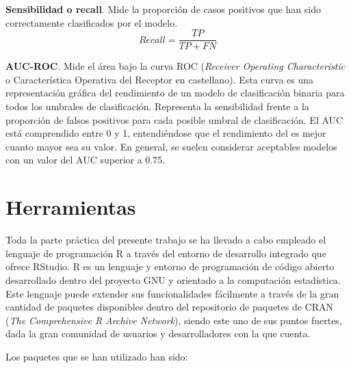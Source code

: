 \documentclass[12pt,a4paper,]{book}
\numberwithin{dummy}{section}
\theoremstyle{ocrenumbox}
\theoremstyle{blacknumex}
\theoremstyle{blacknumbox}
\theoremstyle{ocrenum}
\theoremstyle{ocrenum}
\begin{document}
\textbf{Sensibilidad o recall}. Mide la proporción de casos positivos
que han sido correctamente clasificados por el modelo.
\[ Recall = \frac{TP}{TP + FN}\]

\textbf{AUC-ROC}. Mide el área bajo la curva ROC (\emph{Receiver
Operating Characteristic} o Característica Operativa del Receptor en
castellano). Esta curva es una representación gráfica del rendimiento de
un modelo de clasificación binaria para todos los umbrales de
clasificación. Representa la sensibilidad frente a la proporción de
falsos positivos para cada posible umbral de clasificación. El AUC está
comprendido entre 0 y 1, entendiéndose que el rendimiento del es mejor
cuanto mayor sea su valor. En general, se suelen considerar aceptables
modelos con un valor del AUC superior a 0.75.

\hypertarget{herramientas}{%
\section{Herramientas}\label{herramientas}}

Toda la parte práctica del presente trabajo se ha llevado a cabo
empleado el lenguaje de programación R \citep{Rproject} a través del
entorno de desarrollo integrado que ofrece RStudio. R es un lenguaje y
entorno de programación de código abierto desarrollado dentro del
proyecto GNU y orientado a la computación estadística. Este lenguaje
puede extender sus funcionalidades fácilmente a través de la gran
cantidad de paquetes disponibles dentro del repositorio de paquetes de
CRAN (\emph{The Comprehensive R Archive Network}), siendo este uno de
sus puntos fuertes, dada la gran comunidad de usuarios y desarrolladores
con la que cuenta.

Los paquetes que se han utilizado han sido:
\end{document}
